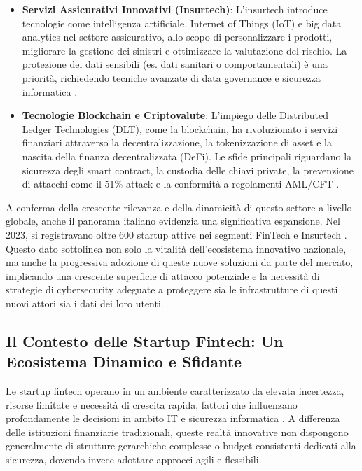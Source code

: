 \begin{itemize}
    \item \textbf{Servizi Assicurativi Innovativi (Insurtech)}: L'insurtech introduce tecnologie come intelligenza artificiale, Internet of Things (IoT) e big data analytics nel settore assicurativo, allo scopo di personalizzare i prodotti, migliorare la gestione dei sinistri e ottimizzare la valutazione del rischio. La protezione dei dati sensibili (es. dati sanitari o comportamentali) è una priorità, richiedendo tecniche avanzate di data governance e sicurezza informatica \cite{eling2018insurtech}.
    
    \item \textbf{Tecnologie Blockchain e Criptovalute}: L'impiego delle Distributed Ledger Technologies (DLT), come la blockchain, ha rivoluzionato i servizi finanziari attraverso la decentralizzazione, la tokenizzazione di asset e la nascita della finanza decentralizzata (DeFi). Le sfide principali riguardano la sicurezza degli smart contract, la custodia delle chiavi private, la prevenzione di attacchi come il 51\% attack e la conformità a regolamenti AML/CFT \cite{catalini2016blockchain}.
    \end{itemize}

A conferma della crescente rilevanza e della dinamicità di questo settore a livello globale, anche il panorama italiano evidenzia una significativa espansione. Nel 2023, si registravano oltre 600 startup attive nei segmenti FinTech e Insurtech \cite{fintech_numeri}. Questo dato sottolinea non solo la vitalità dell'ecosistema innovativo nazionale, ma anche la progressiva adozione di queste nuove soluzioni da parte del mercato, implicando una crescente superficie di attacco potenziale e la necessità di strategie di cybersecurity adeguate a proteggere sia le infrastrutture di questi nuovi attori sia i dati dei loro utenti.
\subsection{Il Contesto delle Startup Fintech: Un Ecosistema Dinamico e Sfidante}

Le startup fintech operano in un ambiente caratterizzato da elevata incertezza, risorse limitate e necessità di crescita rapida, fattori che influenzano profondamente le decisioni in ambito IT e sicurezza informatica \cite{fintechChallenges}. A differenza delle istituzioni finanziarie tradizionali, queste realtà innovative non dispongono generalmente di strutture gerarchiche complesse o budget consistenti dedicati alla sicurezza, dovendo invece adottare approcci agili e flessibili.

